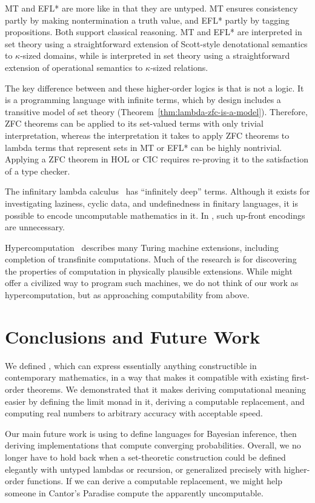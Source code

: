 MT and EFL* are more like \targetlang in that they are untyped. MT ensures consistency partly by making nontermination a truth value, and EFL* partly by tagging propositions.
Both support classical reasoning.
MT and EFL* are interpreted in set theory using a straightforward extension of Scott-style denotational semantics to $\kappa$-sized domains, while \targetlang is interpreted in set theory using a straightforward extension of operational semantics to $\kappa$-sized relations.

The key difference between \targetlang and these higher-order logics is that \targetlang is not a logic. It is a programming language with infinite terms, which by design includes a transitive model of set theory (Theorem~\ref{thm:lambda-zfc-is-a-model}). Therefore, ZFC theorems can be applied to its set-valued terms with only trivial interpretation, whereas the interpretation it takes to apply ZFC theorems to lambda terms that represent sets in MT or EFL* can be highly nontrivial. Applying a ZFC theorem in HOL or CIC requires re-proving it to the satisfaction of a type checker.

The infinitary lambda calculus~\cite{cit:kennaway-1996-inf-lc} has ``infinitely deep'' terms. Although it exists for investigating laziness, cyclic data, and undefinedness in finitary languages, it is possible to encode uncomputable mathematics in it. In \targetlang, such up-front encodings are unnecessary.

Hypercomputation~\cite{cit:ord-2006-hypercomp} describes many Turing machine extensions, including completion of transfinite computations. Much of the research is for discovering the properties of computation in physically plausible extensions. While \targetlang might offer a civilized way to program such machines, we do not think of our work as hypercomputation, but as approaching computability from above.


\section{Conclusions and Future Work}

We defined \targetlang, which can express essentially anything constructible in contemporary mathematics, in a way that makes it compatible with existing first-order theorems. We demonstrated that it makes deriving computational meaning easier by defining the limit monad in it, deriving a computable replacement, and computing real numbers to arbitrary accuracy with acceptable speed.

Our main future work is using \targetlang to define languages for Bayesian inference, then deriving implementations that compute converging probabilities.
Overall, we no longer have to hold back when a set-theoretic construction could be defined elegantly with untyped lambdas or recursion, or generalized precisely with higher-order functions. If we can derive a computable replacement, we might help someone in Cantor's Paradise compute the apparently uncomputable.

